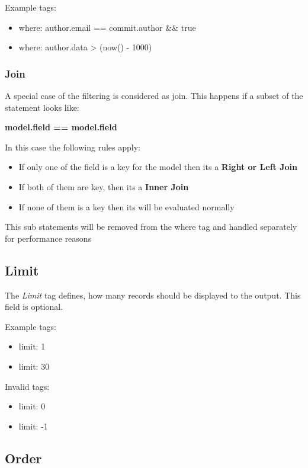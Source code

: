 Example tags:
\begin{itemize}
	\item where: author.email == commit.author \&\& true
	\item where: author.data > (now() - 1000)
\end{itemize}

\subsubsection{Join}

A special case of the filtering is considered as join. 
This happens if a subset of the statement looks like:\newline

\textbf{{model}.{field} == {model}.{field}}\newline

In this case the following rules apply:

\begin{itemize}
	\item If only one of the field is a key for the model then its a \textbf{Right or Left Join}
	\item If both of them are key, then its a \textbf{Inner Join}
	\item If none of them is a key then its will be evaluated normally
\end{itemize}

This sub statements will be removed from the where tag and handled separately for performance reasons

\subsection{Limit}

The \textit{Limit} tag defines, how many records should be displayed to the output.
This field is optional.

Example tags:
\begin{itemize}
	\item limit: 1
	\item limit: 30
\end{itemize}

Invalid tags:
\begin{itemize}
	\item limit: 0
	\item limit: -1
\end{itemize}

\subsection{Order}

